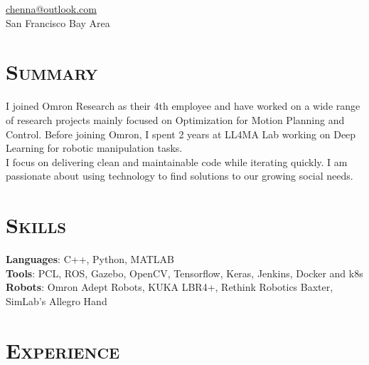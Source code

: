 \documentclass[margin, line]{resume}
\begin{document}
\author{Kautilya Chenna}
{
    \sc
    \hfill \href{mailto:chenna@outlook.com}{chenna@outlook.com}     \vspace{0mm}\\\vspace{0mm}%
    \hfill San Francisco Bay Area                                   \vspace{0mm}\\\vspace{-10.5mm}%
}

\begin{resume}

    \section{\mysidestyle \textsc{Summary}}
    I joined Omron Research as their 4th employee and have worked on a wide
    range of research projects mainly focused on Optimization for Motion
    Planning and Control. Before joining Omron, I spent 2 years at LL4MA Lab
    working on Deep Learning for robotic manipulation tasks.\\[1mm]
    I focus on delivering clean and maintainable code while iterating quickly.
    I am passionate about using technology to find solutions to our growing
    social needs.



    \sectionline
    \section{\mysidestyle \textsc{Skills}}

    \textbf{Languages}: C++, Python, MATLAB \\[1mm]
    \textbf{Tools}: PCL, ROS, Gazebo, OpenCV, Tensorflow, Keras, Jenkins, Docker and k8s \\[1mm]
    \textbf{Robots}: Omron Adept Robots, KUKA LBR4+, Rethink Robotics Baxter, SimLab's Allegro Hand%



    \sectionline
    \section{\mysidestyle \textsc{Experience}}


\end{resume}
\end{document}
